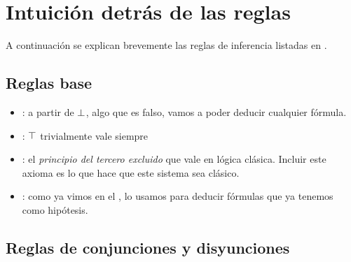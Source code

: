 \section{Intuición detrás de las reglas}

A continuación se explican brevemente las reglas de inferencia listadas en .

\subsection{Reglas base}

\begin{multicols}{2}
    \proofTreeFalseE
    \proofTreeTrueI
\end{multicols}

\begin{multicols}{2}
    \proofTreeLEM
    \proofTreeAx
\end{multicols}

\begin{itemize}
    \item {}: a partir de $\bot$, algo que es falso, vamos a poder deducir cualquier
    fórmula.
    \item {}: $\top$ trivialmente vale siempre
    \item {}: el \textit{principio del tercero excluido} que vale en
    lógica clásica. Incluir este axioma es lo que hace que este sistema sea
    clásico.
    \item {}: como ya vimos en el , lo usamos para
    deducir fórmulas que ya tenemos como hipótesis.
\end{itemize}

\subsection{Reglas de conjunciones y disyunciones}

\proofTreeAndI

\begin{multicols}{2}
    \proofTreeAndEOne
    \proofTreeAndETwo
\end{multicols}

\begin{multicols}{2}
    \proofTreeOrIOne
    \proofTreeOrITwo
\end{multicols}

\proofTreeOrE


